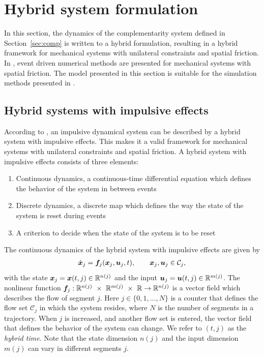\documentclass[../DC2017114Bouma.tex]{subfiles}
\begin{document}
\section{Hybrid system formulation}
In this section, the dynamics of the complementarity system defined in Section~\ref{sec:comp} is written to a hybrid formulation, resulting in a hybrid framework for mechanical systems with unilateral constraints and spatial friction. In \cite[p. 222]{Acary2008}, event driven numerical methods are presented for mechanical systems with spatial friction. The model presented in this section is suitable for the simulation methods presented in \cite{Acary2008}.

%
\subsection{Hybrid systems with impulsive effects}\label{sec:2hyb}
According to \cite{Haddad2006}, an impulsive dynamical system can be described by a hybrid system with impulsive effects. This makes it a valid framework for mechanical systems with unilateral constraints and spatial friction. A hybrid system with impulsive effects consists of three elements:
\begin{enumerate}
\item Continuous dynamics, a continuous-time differential equation which defines the behavior of the system in between events
\item Discrete dynamics, a discrete map which defines the way the state of the system is reset during events
\item A criterion to decide when the state of the system is to be reset
\end{enumerate}

The continuous dynamics of the hybrid system with impulsive effects are given by
\begin{align}
\dot{{\boldsymbol{x}}}_j ={\boldsymbol{f}}_j({\boldsymbol{x}}_j,{\boldsymbol{u}}_j,t), \qquad{\boldsymbol{x}}_j,{\boldsymbol{u}}_j\in \mathcal{C}_j,\label{eq:hybimp1}
\end{align}
with the state ${\boldsymbol{x}}_j = {\boldsymbol{x}}(t,j)\in\mathbb{R}^{n(j)}$ and the input ${\boldsymbol{u}}_j = {\boldsymbol{u}}(t,j)\in\mathbb{R}^{m(j)}$. The nonlinear function $\fb_j:\Rbb^{n(j)}\ \times\ \Rbb^{m(j)}\ \times\ \Rbb\rightarrow \Rbb^{n(j)}$ is a vector field which describes the flow of segment $j$. Here $j\in\{0,1,\dots,N\}$ is a counter that defines the flow set $\mathcal{C}_j$ in which the system resides, where $N$ is the number of segments in a trajectory. When $j$ is increased, and another flow set is entered, the vector field that defines the behavior of the system can change. We refer to $(t,j)$ as the \textit{hybrid time}. Note that the state dimension $n(j)$ and the input dimension $m(j)$ can vary in different segments $j$.
\end{document}
